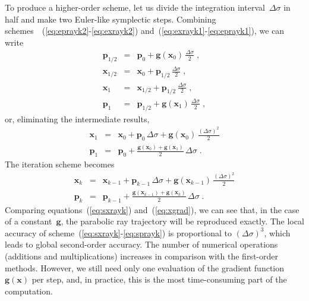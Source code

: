 To produce a higher-order scheme, let us divide the integration
interval~$\Delta \sigma$ in half and make two Euler-like symplectic steps.
Combining schemes~~(\ref{eq:eprayk2}-\ref{eq:exrayk2})
and~(\ref{eq:exrayk1}-\ref{eq:eprayk1}), we can write
\begin{eqnarray}
  \label{eq:spray1}
  \mathbf{p}_{1/2} & = & \mathbf{p}_0 + 
  \mathbf{g}(\mathbf{x}_{0})\,\frac{\Delta \sigma}{2}\;, \\
  \label{eq:sxray1}  
  \mathbf{x}_{1/2} & = & \mathbf{x}_0 + 
  \mathbf{p}_{1/2}\,\frac{\Delta \sigma}{2}\;, \\
  \label{eq:sxray2}  
  \mathbf{x}_{1} & = & \mathbf{x}_{1/2} + 
  \mathbf{p}_{1/2}\,\frac{\Delta \sigma}{2}\;, \\
  \label{eq:spray1}
  \mathbf{p}_{1} & = & \mathbf{p}_{1/2} + 
  \mathbf{g}(\mathbf{x}_{1})\,\frac{\Delta \sigma}{2}\;,
\end{eqnarray}
or, eliminating the intermediate results,
\begin{eqnarray}
  \label{eq:sxray}  
  \mathbf{x}_{1} & = & \mathbf{x}_{0} + 
  \mathbf{p}_{0}\,\Delta \sigma + \mathbf{g}(\mathbf{x}_{0})\,
  \frac{(\Delta \sigma)^2}{2} \\
  \label{eq:spray}
  \mathbf{p}_{1} & = & \mathbf{p}_0 + 
  \frac{\mathbf{g}(\mathbf{x}_{0})+\mathbf{g}(\mathbf{x}_1)}{2}\,
  \Delta \sigma\;.
\end{eqnarray}
The iteration scheme becomes 
\begin{eqnarray}
  \label{eq:sxrayk}  
  \mathbf{x}_{k} & = & \mathbf{x}_{k-1} + 
  \mathbf{p}_{k-1}\,\Delta \sigma + 
  \mathbf{g}(\mathbf{x}_{k-1})\,\frac{(\Delta \sigma)^2}{2}
  \\
  \label{eq:sprayk}
  \mathbf{p}_{k} & = & \mathbf{p}_{k-1} + 
  \frac{\mathbf{g}(\mathbf{x}_{k-1})+\mathbf{g}(\mathbf{x}_{k})}{2}\,
  \Delta \sigma\;.
\end{eqnarray}
Comparing equations~(\ref{eq:sxrayk}) and~(\ref{eq:xgrad}), we can see
that, in the case of a constant~$\mathbf{g}$, the parabolic ray
trajectory will be reproduced exactly. The local accuracy of
scheme~(\ref{eq:sxrayk}-\ref{eq:sprayk}) is proportional to $(\Delta
\sigma)^3$, which leads to global second-order accuracy. The number of
numerical operations (additions and multiplications) increases in
comparison with the first-order methods. However, we still need only
one evaluation of the gradient function~$\mathbf{g}(\mathbf{x})$ per
step, and, in practice, this is the most time-consuming part of the
computation.


